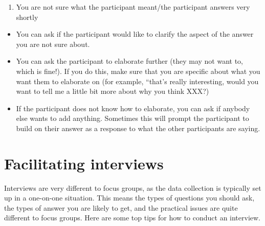 \documentclass[
  english,
  letterpaper,
  DIV=11,
  numbers=noendperiod]{scrreprt}
\providecommand{\tightlist}{%
  \setlength{\itemsep}{0pt}\setlength{\parskip}{0pt}}
\begin{document}
\begin{enumerate}
\def\labelenumi{\arabic{enumi}.}
\setcounter{enumi}{6}
\tightlist
\item
  You are not sure what the participant meant/the participant answers
  very shortly
\end{enumerate}

\begin{tcolorbox}[enhanced jigsaw, breakable, bottomtitle=1mm, leftrule=.75mm, opacityback=0, colbacktitle=quarto-callout-caution-color!10!white, opacitybacktitle=0.6, toprule=.15mm, colback=white, left=2mm, coltitle=black, bottomrule=.15mm, titlerule=0mm, title={Suggested Solutions}, toptitle=1mm, colframe=quarto-callout-caution-color-frame, arc=.35mm, rightrule=.15mm]

\begin{itemize}
\tightlist
\item
  You can ask if the participant would like to clarify the aspect of the
  answer you are not sure about.
\item
  You can ask the participant to elaborate further (they may not want
  to, which is fine!). If you do this, make sure that you are specific
  about what you want them to elaborate on (for example, ``that's really
  interesting, would you want to tell me a little bit more about why you
  think XXX?)
\item
  If the participant does not know how to elaborate, you can ask if
  anybody else wants to add anything. Sometimes this will prompt the
  participant to build on their answer as a response to what the other
  participants are saying.
\end{itemize}

\end{tcolorbox}

\section{Facilitating interviews}\label{facilitating-interviews}

Interviews are very different to focus groups, as the data collection is
typically set up in a one-on-one situation. This means the types of
questions you should ask, the types of answer you are likely to get, and
the practical issues are quite different to focus groups. Here are some
top tips for how to conduct an interview.
\end{document}
